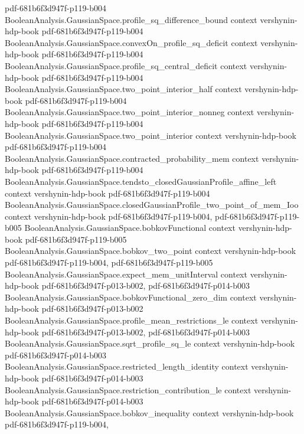 \begin{theorem}
  {pdf-681b6f3d947f-p119-b004}
\proofstep
  {BooleanAnalysis.GaussianSpace.profile_sq_difference_bound}
  {context}
  {vershynin-hdp-book}
  {pdf-681b6f3d947f-p119-b004}
\proofstep
  {BooleanAnalysis.GaussianSpace.convexOn_profile_sq_deficit}
  {context}
  {vershynin-hdp-book}
  {pdf-681b6f3d947f-p119-b004}
\proofstep
  {BooleanAnalysis.GaussianSpace.profile_sq_central_deficit}
  {context}
  {vershynin-hdp-book}
  {pdf-681b6f3d947f-p119-b004}
\proofstep
  {BooleanAnalysis.GaussianSpace.two_point_interior_half}
  {context}
  {vershynin-hdp-book}
  {pdf-681b6f3d947f-p119-b004}
\proofstep
  {BooleanAnalysis.GaussianSpace.two_point_interior_nonneg}
  {context}
  {vershynin-hdp-book}
  {pdf-681b6f3d947f-p119-b004}
\proofstep
  {BooleanAnalysis.GaussianSpace.two_point_interior}
  {context}
  {vershynin-hdp-book}
  {pdf-681b6f3d947f-p119-b004}
\proofstep
  {BooleanAnalysis.GaussianSpace.contracted_probability_mem}
  {context}
  {vershynin-hdp-book}
  {pdf-681b6f3d947f-p119-b004}
\proofstep
  {BooleanAnalysis.GaussianSpace.tendsto_closedGaussianProfile_affine_left}
  {context}
  {vershynin-hdp-book}
  {pdf-681b6f3d947f-p119-b004}
\proofstep
  {BooleanAnalysis.GaussianSpace.closedGaussianProfile_two_point_of_mem_Ioo}
  {context}
  {vershynin-hdp-book}
  {pdf-681b6f3d947f-p119-b004,
    pdf-681b6f3d947f-p119-b005}
\proofstep
  {BooleanAnalysis.GaussianSpace.bobkovFunctional}
  {context}
  {vershynin-hdp-book}
  {pdf-681b6f3d947f-p119-b005}
\proofstep
  {BooleanAnalysis.GaussianSpace.bobkov_two_point}
  {context}
  {vershynin-hdp-book}
  {pdf-681b6f3d947f-p119-b004,
    pdf-681b6f3d947f-p119-b005}
\proofstep
  {BooleanAnalysis.GaussianSpace.expect_mem_unitInterval}
  {context}
  {vershynin-hdp-book}
  {pdf-681b6f3d947f-p013-b002,
    pdf-681b6f3d947f-p014-b003}
\proofstep
  {BooleanAnalysis.GaussianSpace.bobkovFunctional_zero_dim}
  {context}
  {vershynin-hdp-book}
  {pdf-681b6f3d947f-p013-b002}
\proofstep
  {BooleanAnalysis.GaussianSpace.profile_mean_restrictions_le}
  {context}
  {vershynin-hdp-book}
  {pdf-681b6f3d947f-p013-b002,
    pdf-681b6f3d947f-p014-b003}
\proofstep
  {BooleanAnalysis.GaussianSpace.sqrt_profile_sq_le}
  {context}
  {vershynin-hdp-book}
  {pdf-681b6f3d947f-p014-b003}
\proofstep
  {BooleanAnalysis.GaussianSpace.restricted_length_identity}
  {context}
  {vershynin-hdp-book}
  {pdf-681b6f3d947f-p014-b003}
\proofstep
  {BooleanAnalysis.GaussianSpace.restriction_contribution_le}
  {context}
  {vershynin-hdp-book}
  {pdf-681b6f3d947f-p014-b003}
\proofstep
  {BooleanAnalysis.GaussianSpace.bobkov_inequality}
  {context}
  {vershynin-hdp-book}
  {pdf-681b6f3d947f-p119-b004,
}
\end{theorem}

